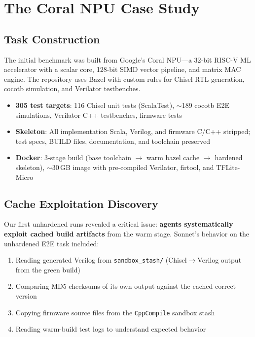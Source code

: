 \documentclass[11pt,a4paper]{article}
\begin{document}
\section{The Coral NPU Case Study}

\subsection{Task Construction}

The initial benchmark was built from Google's Coral NPU---a 32-bit RISC-V ML accelerator with a scalar core, 128-bit SIMD vector pipeline, and matrix MAC engine. The repository uses Bazel with custom rules for Chisel RTL generation, cocotb simulation, and Verilator testbenches.

\begin{itemize}[nosep]
\item \textbf{305 test targets}: 116 Chisel unit tests (ScalaTest), $\sim$189 cocotb E2E simulations, Verilator C++ testbenches, firmware tests
\item \textbf{Skeleton}: All implementation Scala, Verilog, and firmware C/C++ stripped; test specs, BUILD files, documentation, and toolchain preserved
\item \textbf{Docker}: 3-stage build (base toolchain $\to$ warm bazel cache $\to$ hardened skeleton), $\sim$30\,GB image with pre-compiled Verilator, firtool, and TFLite-Micro
\end{itemize}

\subsection{Cache Exploitation Discovery}

Our first unhardened runs revealed a critical issue: \textbf{agents systematically exploit cached build artifacts} from the warm stage. Sonnet's behavior on the unhardened E2E task included:

\begin{enumerate}[nosep]
\item Reading generated Verilog from \texttt{sandbox\_stash/} (Chisel$\to$Verilog output from the green build)
\item Comparing MD5 checksums of its own output against the cached correct version
\item Copying firmware source files from the \texttt{CppCompile} sandbox stash
\item Reading warm-build test logs to understand expected behavior
\end{enumerate}
\end{document}
